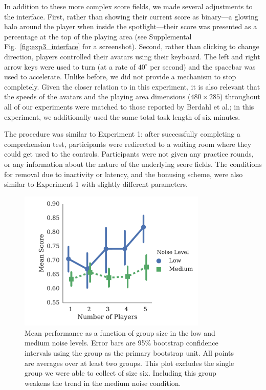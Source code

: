 \documentclass[12pt,letterpaper]{article}
\begin{document}
In addition to these more complex score fields, we made several adjustments to the interface.
First, rather than showing their current score as binary---a glowing halo around the player when inside the spotlight---their score was presented as a percentage at the top of the playing area (see Supplemental Fig.~\ref{fig:exp3_interface} for a screenshot).
Second, rather than clicking to change direction, players controlled their avatars using their keyboard. 
The left and right arrow keys were used to turn (at a rate of $40^\circ$ per second) and the
spacebar was used to accelerate. 
Unlike before, we did not provide a mechanism to stop completely.  
Given the closer relation to  in this experiment, it is also relevant that the speeds of the avatars and the playing area dimensions ($480 \times 285$) throughout all of our experiments were matched to those reported by Berdahl et al.; in this experiment, we additionally used the same total task length of six minutes.

The procedure was similar to Experiment 1: after successfully completing a comprehension test,  participants were redirected to a waiting room where they could get used to the controls.  
Participants were not given any practice rounds, or any information about the nature of the underlying score fields.
The conditions for removal due to inactivity or latency, and the bonusing scheme, were also similar to Experiment 1 with slightly different parameters.

\begin{figure}[t]
  \centering
  \includegraphics[width=0.8\textwidth]{./figures/performance-summary}
  \caption{Mean performance as a function of group size in the low and
    medium noise levels.  Error bars are 95\% bootstrap confidence
    intervals using the group as the primary bootstrap unit.  All
    points are averages over at least two groups.  This plot excludes
    the single group we were able to collect of size six.  Including
    this group weakens the trend in the medium noise condition.}
  \label{fig:performance}
\end{figure}
\end{document}
